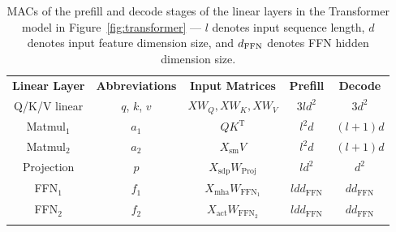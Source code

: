 \begin{table}[t]
    \centering
    \caption{MACs of the prefill and decode stages of the linear layers in the Transformer model in Figure~\ref{fig:transformer} --- \textnormal{$l$ denotes input sequence length, $d$ denotes input feature dimension size, and $d_{\text{FFN}}$ denotes FFN hidden dimension size.}}
    \label{tab:flops}
    \small
    \begin{tabular}{ccccc}\Xhline{1pt}
        \textbf{Linear Layer}&  \textbf{Abbreviations} & \textbf{Input Matrices} & \textbf{Prefill} & \textbf{Decode}\\\Xhline{1pt}
         Q/K/V linear&  $q$, $k$, $v$ & $XW_Q, XW_K, XW_V$ & $3ld^2$ & $3d^2$\\
         Matmul$_1$&  $a_1$ & $QK^\mathrm{T}$ & $l^2d$ & $(l+1)d$\\
         Matmul$_2$&  $a_2$ & $X_{\text{sm}}V$ & $l^2d$ & $(l+1)d$\\
         Projection&  $p$ & $X_{\text{sdp}}W_{\text{Proj}}$& $ld^2$ & $d^2$\\
         FFN$_1$&  $f_1$ & $X_{\text{mha}}W_{\text{FFN}_1}$ & $ldd_{\text{FFN}}$ & $dd_{\text{FFN}}$\\
         FFN$_2$&  $f_2$ & $X_{\text{act}}W_{\text{FFN}_2}$ & $ldd_{\text{FFN}}$ & $dd_{\text{FFN}}$\\\Xhline{1pt}
    \end{tabular}
\end{table}

